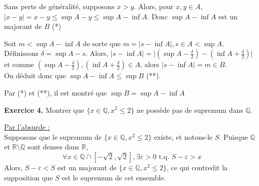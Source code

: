 \documentclass[a4paper, 10pt]{report}
\providecommand{\abs}[1]{\lvert#1\rvert}
\begin{document}
	\colorbox{solution}{\begin{minipage}{0.9\textwidth}
		Sans perte de généralité, supposons $x > y$. Alors, pour
		$x, y \in A$,\\
		$\abs{x-y} = x - y \leq \sup A - y \leq \sup A - \inf A.$
		Donc $\sup A - \inf A$ est un majorant de $B$ (*)
		
		Soit $m < \sup A - \inf A$ de sorte que
		$m = \abs{s - \inf A}, s \in A < \sup A$.
		Définissons $\delta = \sup A - s$. Alors, $\abs{s - \inf A} =
			\abs{(\sup A - \frac{\delta}{2}) - (\inf A + \frac{\delta}{2})}$
		et comme
		$(\sup A - \frac{\delta}{2}), (\inf A + \frac{\delta}{2}) \in A$,
		alors $\abs{s - \inf A} = m \in B$.\\
		On déduit donc que $\sup A - \inf A \leq \sup B$ (**).
		
		Par (*) et (**), il est montré que $\sup B = \sup A - \inf A$
	\end{minipage}}
	
	\vspace{5mm}
	\noindent
	\textbf{Exercice 4.} Montrer que $\{x \in \mathbb{Q}, x^2 \leq 2\}$
	ne possède pas de supremum dans $\mathbb{Q}$.
	
	\colorbox{solution}{\begin{minipage}{0.9\textwidth}
		\underline{Par l'absurde :}\\
		Supposons que le supremum de $\{x \in \mathbb{Q}, x^2 \leq 2\}$
		existe, et notons-le $S$. Puisque $\mathbb{Q}$ et
		$\mathbb{R} \setminus \mathbb{Q}$ sont denses dans $\mathbb{R}$,
		\[\forall x \in \mathbb{Q}\cap[-\sqrt{2}, \sqrt{2}],
		\exists \varepsilon > 0 \text{ t.q. } S - \varepsilon > x\]
		Alors, $S - \varepsilon < S$ est un majorant de
		$\{x \in \mathbb{Q}, x^2 \leq 2\}$, ce qui contredit la
		supposition que $S$ est le supremum de cet ensemble.
	\end{minipage}}
	
\end{document}
